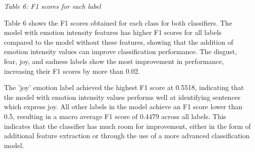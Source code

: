 \documentclass[journal]{./IEEE/IEEEtran}
\begin{document}
\begin{table}[h!]
    \centering
    \emph{Table 6: F1 scores for each label}
\end{table}

Table 6 shows the F1 scores obtained for each class for both classifiers. The model with emotion intensity features has higher F1 scores for all labels compared to the model without these features, showing that the addition of emotion intensity values can improve classification performance. The disgust, fear, joy, and sadness labels show the most improvement in performance, increasing their F1 scores by more than 0.02.

The 'joy' emotion label achieved the highest F1 score at 0.5518, indicating that the model with emotion intensity values performs well at identifying sentences which express joy. All other labels in the model achieve an F1 score lower than 0.5, resulting in a macro average F1 score of 0.4479 across all labels. This indicates that the classifier has much room for improvement, either in the form of additional feature extraction or through the use of a more advanced classification model.
\end{document}
